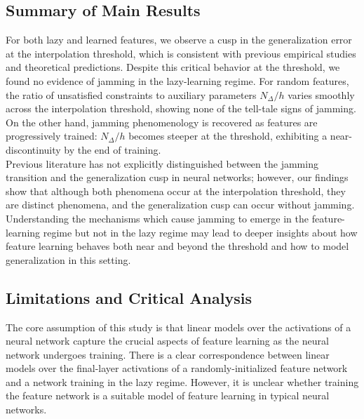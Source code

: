 \documentclass[11pt]{article}
\begin{document}
\subsection{Summary of Main Results} 

For both lazy and learned features, we observe a cusp in the generalization error at the interpolation threshold, which is consistent with previous empirical studies and theoretical predictions. Despite this critical behavior at the threshold, we found no evidence of jamming in the lazy-learning regime. For random features, the ratio of unsatisfied constraints to auxiliary parameters $N_\Delta/h$ varies smoothly across the interpolation threshold, showing none of the tell-tale signs of jamming. On the other hand, jamming phenomenology is recovered as features are progressively trained: $N_\Delta/h$ becomes steeper at the threshold, exhibiting a near-discontinuity by the end of training.\\

Previous literature has not explicitly distinguished between the jamming transition and the generalization cusp in neural networks; however, our findings show that although both phenomena occur at the interpolation threshold, they are distinct phenomena, and the generalization cusp can occur without jamming. Understanding the mechanisms which cause jamming to emerge in the feature-learning regime but not in the lazy regime may lead to deeper insights about how feature learning behaves both near and beyond the threshold and how to model generalization in this setting.\\

\subsection{Limitations and Critical Analysis}

The core assumption of this study is that linear models over the activations of a neural network capture the crucial aspects of feature learning as the neural network undergoes training. There is a clear correspondence between linear models over the final-layer activations of a randomly-initialized feature network and a network training in the lazy regime. However, it is unclear whether training the feature network is a suitable model of feature learning in typical neural networks.\\
\end{document}
